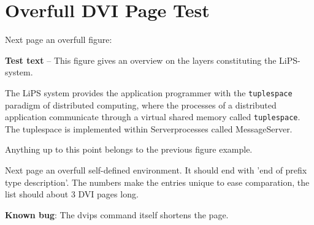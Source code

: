 \section{Overfull DVI Page Test}

Next page an overfull figure:

\clearpage
{}
{{\bf Test text} --
This figure gives an overview on the layers constituting the LiPS-system.

The LiPS system provides the application programmer with the
{\tt tuplespace} paradigm of distributed
computing, where the processes of a distributed application communicate
through a virtual shared memory called {\tt tuplespace}.
The tuplespace is implemented within Serverprocesses called MessageServer.
}
\clearpage
Anything up to this point belongs to the previous figure example.


Next page an overfull self-defined environment. It should end with
'end of prefix type description'. The numbers make the entries unique
to ease comparation, the list should about 3 DVI pages long.

{\bf Known bug}: The dvips command itself shortens the page.

\clearpage
\def\mylist{\small\bf\tt}

